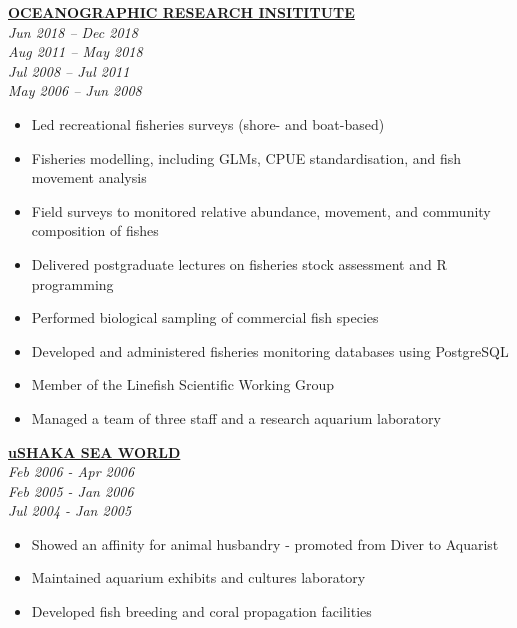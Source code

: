 \documentclass[10pt,a4paper]{article}
\begin{document}
\noindent \textbf{\href{https://saambr.org.za/oceanographic-research-institute-ori/}{OCEANOGRAPHIC RESEARCH INSITITUTE}}  \\
 \textit{Jun 2018 -- Dec 2018} \\
 \textit{Aug 2011 -- May 2018} \\
  \textit{Jul 2008 -- Jul 2011}\\
 \textit{May 2006 -- Jun 2008}
\begin{itemize}[itemsep=2pt, parsep=0pt]
  \item Led recreational fisheries surveys (shore- and boat-based)
  \item Fisheries modelling, including GLMs, CPUE standardisation, and fish movement analysis
  \item Field surveys to monitored relative abundance, movement, and community composition of fishes
  \item Delivered postgraduate lectures on fisheries stock assessment and R programming
  \item Performed biological sampling of commercial fish species
  \item Developed and administered fisheries monitoring databases using PostgreSQL
  \item Member of the Linefish Scientific Working Group
  \item Managed a team of three staff and a research aquarium laboratory\\
\end{itemize}



\noindent \textbf{\href{https://saambr.org.za/ushaka-sea-world//}{uSHAKA SEA WORLD}}  \\
 \textit{Feb 2006 - Apr 2006}\\
 \textit{ Feb 2005 - Jan 2006}\\
 \textit{Jul 2004 - Jan 2005}
 \begin{itemize}[itemsep=2pt, parsep=0pt]
   \item Showed an affinity for animal husbandry - promoted from Diver to Aquarist
   \item Maintained aquarium exhibits and cultures laboratory
   \item Developed fish breeding and coral propagation facilities
\end{itemize}
\end{document}

